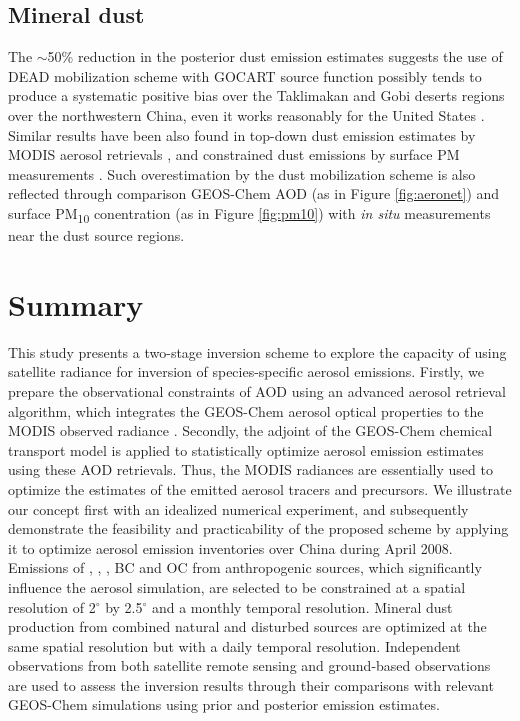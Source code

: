  \subsection{Mineral dust} 

  The $\sim$50\% reduction in the posterior dust emission estimates suggests 
the use of DEAD mobilization scheme with GOCART source function possibly tends
to produce a systematic positive bias over the Taklimakan and Gobi deserts 
regions over the northwestern China, even it works reasonably for the United 
States \citep{Fairlie07}. Similar results have been also found in top-down 
dust emission estimates by MODIS aerosol retrievals \citep{Wang12}, 
and constrained dust emissions by surface PM measurements \citep{Ku11}. 
Such overestimation by the dust mobilization scheme is also reflected through
comparison GEOS-Chem AOD (as in Figure \ref{fig:aeronet}) and surface 
PM\textsubscript{10} conentration (as in Figure \ref{fig:pm10}) with
\textit{in situ} measurements near the dust source regions. 


\section{Summary} \label{sec:invsummary}

 This study presents a two-stage inversion scheme to explore the capacity of using satellite radiance for inversion of species-specific aerosol emissions.
 Firstly, we prepare the observational constraints of AOD using an advanced aerosol retrieval algorithm,
 which integrates the GEOS-Chem aerosol optical properties to the MODIS observed radiance \citep{Wang10}.
 Secondly, the adjoint of the GEOS-Chem chemical transport model is applied to statistically optimize aerosol emission estimates using these AOD retrievals.
 Thus, the MODIS radiances are essentially used to optimize the estimates of the emitted aerosol tracers and precursors.
 We illustrate our concept first with an idealized numerical experiment,
 and subsequently demonstrate the feasibility and practicability of the proposed scheme by applying it to optimize aerosol emission inventories over China during April 2008.
 Emissions of , , , BC and OC from anthropogenic sources,
 which significantly influence the aerosol simulation, are selected to be constrained at a spatial resolution of 2$^{\circ}$ by 2.5$^{\circ}$ and a monthly temporal resolution.
 Mineral dust production from combined natural and disturbed sources are optimized at the same spatial resolution but with a daily temporal resolution.
 Independent observations from both satellite remote sensing and ground-based observations are used to assess the inversion results through their comparisons with relevant GEOS-Chem simulations using prior and posterior emission estimates. 

